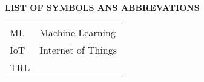 \documentclass[a4paper, 12pt]{report}
\begin{document}
			
			
			\renewcommand{\contentsname}{\fontsize{14}{17}\selectfont
				\begin{center}
					TABLE OF CONTENTS
			\end{center}}
			\tableofcontents
			
			\begin{center}
				
				
				\renewcommand{\listfigurename}{\fontsize{14}{17}\selectfont \centering LIST OF FIGURES}
				\listoffigures
			\end{center}    
			\newpage
			\renewcommand{\listtablename}{\fontsize{14}{17}\selectfont \centering 
				\begin{centre}
					LIST OF TABLES
			\end{center}}
			
			
			    \pagebreak
			{\fontsize{14}{17}\selectfont \begin{center}
					\textbf{LIST OF SYMBOLS ANS ABBREVATIONS}
			\end{center} }
			
			
			
			\vspace{24pt}
			
			
			\begin{tabular}{ll}
				
				
				
				
				ML  &Machine Learning \\ 
				IoT  & Internet of Things \\ 
				TRL &   \\ 
				
				
			\end{tabular}
			\label{tab1}
			
			
			
			\titlespacing*{\chapter}{0pt}{0pt}{48pt}
			
\end{document}
